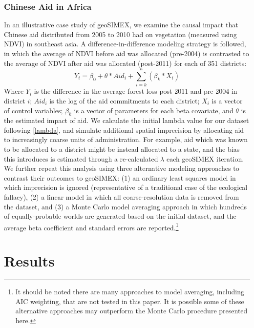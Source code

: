 \subsubsection{Chinese Aid in Africa}
In an illustrative case study of geoSIMEX, we examine the causal impact that Chinese aid distributed from 2005 to 2010 had on vegetation (measured using NDVI) in southeast asia.  
A difference-in-difference modeling strategy is followed, in which the average of NDVI before aid was allocated (pre-2004) is contrasted to the average of NDVI after aid was allocated (post-2011) for each of 351 districts:
\begin{equation}\label{eq:caseStudy}
Y_{i} = \beta_0 + \theta * Aid_{i} + \sum_{i=k}^{n}(\beta_{k} * X_{i})
\end{equation}
Where $Y_{i}$ is the difference in the average forest loss post-2011 and pre-2004 in district $i$; $Aid_{i}$ is the log of the aid commitments to each district; $X_{i}$ is a vector of control variables; $\beta_{k}$ is a vector of parameters for each beta covariate, and $\theta$ is the estimated impact of aid.
We calculate the initial lambda value for our dataset following \ref{lambda}, and simulate additional spatial imprecision by allocating aid to increasingly coarse units of administration.  
For example, aid which was known to be allocated to a district might be instead allocated to a state, and the bias this introduces is estimated through a re-calculated $\lambda$ each geoSIMEX iteration.
We further repeat this analysis using three alternative modeling approaches to contrast their outcomes to geoSIMEX: (1) an ordinary least squares model in which imprecision is ignored (representative of a traditional case of the ecological fallacy), (2) a linear model in which all coarse-resolution data is removed from the dataset, and (3) a Monte Carlo model averaging approach in which hundreds of equally-probable worlds are generated based on the initial dataset, and the average beta coefficient and standard errors are reported.\footnote{It should be noted there are many approaches to model averaging, including AIC weighting, that are not tested in this paper. It is possible some of these alternative approaches may outperform the Monte Carlo procedure presented here.}











\newpage

\section{Results}
